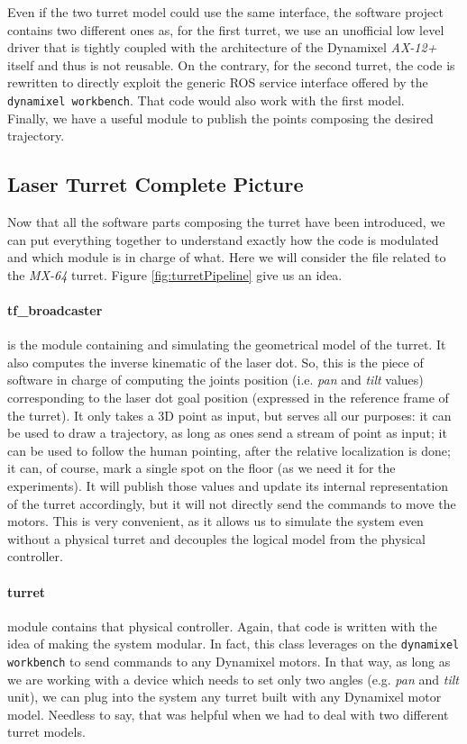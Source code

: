 Even if the two turret model could use the same interface, the software project contains two different ones as, for the first turret, we use an unofficial low level driver that is tightly coupled with the architecture of the Dynamixel \emph{AX-12+} itself and thus is not reusable. On the contrary, for the second turret, the code is rewritten to directly exploit the generic ROS service interface offered by the \texttt{dynamixel workbench}. That code would also work with the first model.\\
Finally, we have a useful module to publish the points composing the desired trajectory.

\subsection{Laser Turret Complete Picture}
Now that all the software parts composing the turret have been introduced, we can put everything together to understand exactly how the code is modulated and which module is in charge of what. Here we will consider the file related to the \emph{MX-64} turret. Figure \ref{fig:turretPipeline} give us an idea.
\paragraph{tf\_broadcaster} is the module containing and simulating the geometrical model of the turret. It also computes the inverse kinematic of the laser dot. So, this is the piece of software in charge of computing the joints position (i.e. \emph{pan} and \emph{tilt} values) corresponding to the laser dot goal position (expressed in the reference frame of the turret). It only takes a 3D point as input, but serves all our purposes: it can be used to draw a trajectory, as long as ones send a stream of point as input; it can be used to follow the human pointing, after the relative localization is done; it can, of course, mark a single spot on the floor (as we need it for the experiments).
It will publish those values and update its internal representation of the turret accordingly, but it will not directly send the commands to move the motors. This is very convenient, as it allows us to simulate the system even without a physical turret and decouples the logical model from the physical controller.\\
\paragraph{turret} module contains that physical controller. Again, that code is written with the idea of making the system modular. In fact, this class leverages on the \texttt{dynamixel workbench} to send commands to any Dynamixel motors. In that way, as long as we are working with a device which needs to set only two angles (e.g. \emph{pan} and \emph{tilt} unit), we can plug into the system any turret built with any Dynamixel motor model. Needless to say, that was helpful when we had to deal with two different turret models.\\
